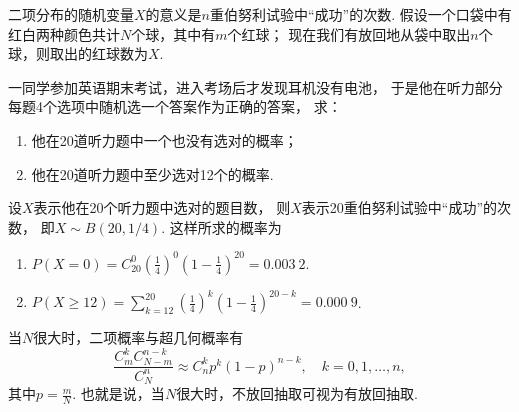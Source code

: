 二项分布的随机变量\(X\)的意义是\(n\)重伯努利试验中“成功”的次数.
假设一个口袋中有红白两种颜色共计\(N\)个球，其中有\(m\)个红球；
现在我们有放回地从袋中取出\(n\)个球，则取出的红球数为\(X\).

\begin{example}
一同学参加英语期末考试，进入考场后才发现耳机没有电池，
于是他在听力部分每题4个选项中随机选一个答案作为正确的答案，
求：\begin{enumerate}
	\item 他在20道听力题中一个也没有选对的概率；
	\item 他在20道听力题中至少选对12个的概率.
\end{enumerate}
\begin{solution}
设\(X\)表示他在20个听力题中选对的题目数，
则\(X\)表示20重伯努利试验中“成功”的次数，
即\(X \sim B(20, 1/4)\).
这样所求的概率为\begin{enumerate}
	\item \(P(X=0) = C_{20}^0 \left(\frac14\right)^0 \left(1-\frac14\right)^{20} = 0.003\ 2\).
	\item \(P(X \geq 12) = \sum_{k=12}^{20} \left(\frac14\right)^k \left(1-\frac14\right)^{20-k} = 0.000\ 9\).
\end{enumerate}
\end{solution}
\end{example}

\begin{theorem}
当\(N\)很大时，二项概率与超几何概率有\[
	\frac{C_m^k C_{N-m}^{n-k}}{C_N^n}
	\approx
	C_n^k p^k (1-p)^{n-k}, \quad k=0,1,\dotsc,n,
\]
其中\(p=\frac{m}{N}\).
也就是说，当\(N\)很大时，不放回抽取可视为有放回抽取.
\end{theorem}

